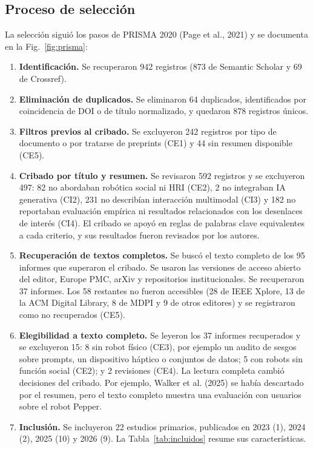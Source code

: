 \documentclass[runningheads]{llncs}
\begin{document}
\subsection{Proceso de selección}
La selección siguió los pasos de PRISMA 2020 (Page et al., 2021) y se documenta en la Fig.~\ref{fig:prisma}:

\begin{enumerate}
\item \textbf{Identificación.} Se recuperaron 942 registros (873 de Semantic Scholar y 69 de Crossref).
\item \textbf{Eliminación de duplicados.} Se eliminaron 64 duplicados, identificados por coincidencia de DOI o de título normalizado, y quedaron 878 registros únicos.
\item \textbf{Filtros previos al cribado.} Se excluyeron 242 registros por tipo de documento o por tratarse de preprints (CE1) y 44 sin resumen disponible (CE5).
\item \textbf{Cribado por título y resumen.} Se revisaron 592 registros y se excluyeron 497: 82 no abordaban robótica social ni HRI (CE2), 2 no integraban IA generativa (CI2), 231 no describían interacción multimodal (CI3) y 182 no reportaban evaluación empírica ni resultados relacionados con los desenlaces de interés (CI4). El cribado se apoyó en reglas de palabras clave equivalentes a cada criterio, y sus resultados fueron revisados por los autores.
\item \textbf{Recuperación de textos completos.} Se buscó el texto completo de los 95 informes que superaron el cribado. Se usaron las versiones de acceso abierto del editor, Europe PMC, arXiv y repositorios institucionales. Se recuperaron 37 informes. Los 58 restantes no fueron accesibles (28 de IEEE Xplore, 13 de la ACM Digital Library, 8 de MDPI y 9 de otros editores) y se registraron como no recuperados (CE5).
\item \textbf{Elegibilidad a texto completo.} Se leyeron los 37 informes recuperados y se excluyeron 15: 8 sin robot físico (CE3), por ejemplo un audito de sesgos sobre prompts, un dispositivo háptico o conjuntos de datos; 5 con robots sin función social (CE2); y 2 revisiones (CE4). La lectura completa cambió decisiones del cribado. Por ejemplo, Walker et al. (2025) se había descartado por el resumen, pero el texto completo muestra una evaluación con usuarios sobre el robot Pepper.
\item \textbf{Inclusión.} Se incluyeron 22 estudios primarios, publicados en 2023 (1), 2024 (2), 2025 (10) y 2026 (9). La Tabla~\ref{tab:incluidos} resume sus características.
\end{enumerate}
\end{document}
